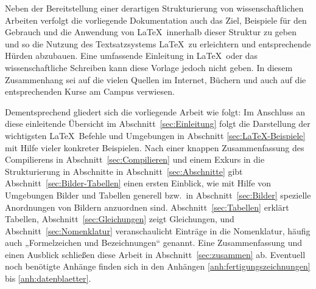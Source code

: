Neben der Bereitstellung einer derartigen Strukturierung von
wissenschaftlichen Arbeiten verfolgt die vorliegende Dokumentation
auch das Ziel, Beispiele für den Gebrauch und die Anwendung von
\LaTeX\ innerhalb dieser Struktur zu geben und so die Nutzung des
Textsatzsystems \LaTeX\ zu erleichtern und entsprechende Hürden
abzubauen. 
Eine umfassende Einleitung in \LaTeX\ oder das wissenschaftliche
Schreiben kann diese Vorlage jedoch nicht geben. 
In diesem Zusammenhang sei auf die vielen Quellen im Internet,
Büchern und auch auf die entsprechenden Kurse am Campus verwiesen. 

Dementsprechend gliedert sich die vorliegende Arbeit wie folgt: 
Im Anschluss an diese einleitende Übersicht im
Abschnitt~\ref{sec:Einleitung} folgt die Darstellung der wichtigsten
\LaTeX\ Befehle und Umgebungen in Abschnitt \ref{sec:LaTeX-Beispiele}
mit Hilfe vieler konkreter Beispielen.
Nach einer knappen Zusammenfassung des Compilierens in Abschnitt~\ref{sec:Compilieren}
und einem Exkurs in die Strukturierung in Abschnitte in Abschnitt~\ref{sec:Abschnitte}
gibt Abschnitt~\ref{sec:Bilder-Tabellen} einen ersten Einblick,
wie mit Hilfe von Umgebungen Bilder und Tabellen generell
bzw.\ in Abschnitt~\ref{sec:Bilder}
spezielle Anordnungen von Bildern anzuordnen sind.
Abschnitt~\ref{sec:Tabellen} erklärt Tabellen,
Abschnitt~\ref{sec:Gleichungen} zeigt Gleichungen,
und Abschnitt~\ref{sec:Nomenklatur} veranschaulicht Einträge in die Nomenklatur,
häufig auch „Formelzeichen und Bezeichnungen“ genannt.
Eine Zusammenfassung und einen Ausblick schließen diese Arbeit in
Abschnitt~\ref{sec:zusammen} ab. Eventuell noch benötigte Anhänge
finden sich in den Anhängen \ref{anh:fertigungszeichnungen} bis
\ref{anh:datenblaetter}. 
